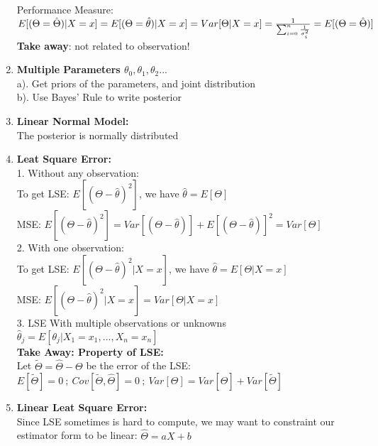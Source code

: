 \documentclass[10pt,landscape]{article}
\begin{document}
\begin{multicols}{3}
\begin{enumerate}
			Performance Measure:\\
			$E[(\Theta = \hat \Theta)|X = x] = E[(\Theta = \hat \theta)|X = x] \\ = Var[\Theta|X = x] = \frac{1}{\sum_{i=0}^n \frac{1}{\sigma_i^2}} = E[(\Theta = \hat \Theta)] $\\
			\textbf{Take away}: not related to observation!\\
			
			
	\item \textbf{Multiple Parameters $\theta_0, \theta_1, \theta_2 ...$}\\
			a). Get priors of the parameters, and joint distribution\\
			b). Use Bayes' Rule to write posterior\\
			
	\item \textbf{Linear Normal Model:}\\
			The posterior is normally distributed\\
			
			
	\item \textbf{Leat Square Error:}\\
			1. Without any observation:\\
			To get LSE: $E[(\Theta- \hat \theta)^2]$, we have $\hat \theta = E[\Theta]$\\
			MSE: $E[(\Theta- \hat \theta)^2] = Var[(\Theta- \hat \theta)] + E[(\Theta- \hat \theta)]^2 = Var[\Theta]$\\
			
			2. With one observation:\\
			To get LSE: $E[(\Theta- \hat \theta)^2|X = x]$, we have $\hat \theta = E[\Theta|X = x]$\\
			MSE: $E[(\Theta- \hat \theta)^2|X = x] = Var[\Theta|X = x]$\\
			
			3. LSE With multiple observations or unknowns\\
			$\hat \theta_j = E[\theta_j | X_1 = x_1, ..., X_n = x_n]$\\
			
			\textbf{Take Away: Property of LSE:}\\
			Let $\tilde \Theta = \hat \Theta - \Theta$ be the error of the LSE:\\
			$E[\tilde \Theta] = 0 \ ;\  Cov[\tilde \Theta, \hat \Theta] = 0\ ;\ Var[\Theta] = Var[\hat \Theta] + Var[\tilde \Theta]$\\
			
	\item \textbf{Linear Leat Square Error:}\\
			Since LSE sometimes is hard to compute, we may want to constraint our estimator form to be linear: $\hat \Theta = aX+b$\\
			

\end{enumerate}
\end{multicols}
\end{document}
